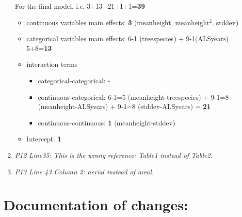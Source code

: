 \documentclass{article}
\begin{document}
\begin{enumerate}
{   For the final model, i.e. 3+13+21+1+1=\textbf{39}
     \begin{itemize}
	\item continuous variables main effects: \textbf{3} (meanheight, meanheight$^2$, stddev)
	\item categorical variables main effects: 6-1 (treespecies) + 9-1(ALSyears) = 5+8=\textbf{13}
	\item interaction terms
	\begin{itemize}
		\item categorical-categorical: -
		\item continuous-categorical: 6-1=5 (meanheight-treespecies) + 9-1=8 (meanheight-ALSyears) + 9-1=8 (stddev-ALSyears) = \textbf{21}
		\item continuous-continuous: \textbf{1} (meanheight-stddev)
	\end{itemize}
	\item Intercept: \textbf{1}
      \end{itemize}
  }
	
	\item \textit{P12 Line35: This is the wrong reference: Table1 instead of Table2.}

	
	\item \textit{P13 Line 43 Column 2: aerial instead of areal.}

	
\end{enumerate}
\newpage

\section*{Documentation of changes:}
\end{document}
